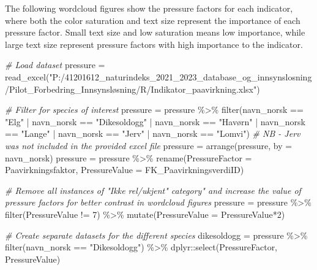 \documentclass[
]{book}
\newenvironment{Shaded}{\begin{snugshade}}{\end{snugshade}}
\newcommand{\AttributeTok}[1]{\textcolor[rgb]{0.77,0.63,0.00}{#1}}
\newcommand{\CommentTok}[1]{\textcolor[rgb]{0.56,0.35,0.01}{\textit{#1}}}
\newcommand{\DecValTok}[1]{\textcolor[rgb]{0.00,0.00,0.81}{#1}}
\newcommand{\FunctionTok}[1]{\textcolor[rgb]{0.00,0.00,0.00}{#1}}
\newcommand{\NormalTok}[1]{#1}
\newcommand{\OtherTok}[1]{\textcolor[rgb]{0.56,0.35,0.01}{#1}}
\newcommand{\SpecialCharTok}[1]{\textcolor[rgb]{0.00,0.00,0.00}{#1}}
\newcommand{\StringTok}[1]{\textcolor[rgb]{0.31,0.60,0.02}{#1}}
\begin{document}
The following wordcloud figures show the pressure factors for each indicator, where both the color saturation and text size represent the importance of each pressure factor. Small text size and low saturation means low importance, while large text size represent pressure factors with high importance to the indicator.

\begin{Shaded}
\begin{Highlighting}[]

\CommentTok{\# Load dataset}
\NormalTok{pressure }\OtherTok{=} \FunctionTok{read\_excel}\NormalTok{(}\StringTok{"P:/41201612\_naturindeks\_2021\_2023\_database\_og\_innsynslosning/Pilot\_Forbedring\_Innsynsløsning/R/Indikator\_paavirkning.xlsx"}\NormalTok{)}

\CommentTok{\# Filter for species of interest}
\NormalTok{pressure }\OtherTok{=}\NormalTok{ pressure }\SpecialCharTok{\%\textgreater{}\%} \FunctionTok{filter}\NormalTok{(navn\_norsk }\SpecialCharTok{==} \StringTok{"Elg"} \SpecialCharTok{|}\NormalTok{ navn\_norsk }\SpecialCharTok{==} \StringTok{"Dikesoldogg"} \SpecialCharTok{|}\NormalTok{ navn\_norsk }\SpecialCharTok{==} \StringTok{"Havørn"} \SpecialCharTok{|}\NormalTok{ navn\_norsk }\SpecialCharTok{==} \StringTok{"Lange"} \SpecialCharTok{|}\NormalTok{ navn\_norsk }\SpecialCharTok{==} \StringTok{"Jerv"} \SpecialCharTok{|}\NormalTok{ navn\_norsk }\SpecialCharTok{==} \StringTok{"Lomvi"}\NormalTok{) }\CommentTok{\# NB {-} Jerv was not included in the provided excel file}
\NormalTok{pressure }\OtherTok{=} \FunctionTok{arrange}\NormalTok{(pressure, }\AttributeTok{by =}\NormalTok{ navn\_norsk)}
\NormalTok{pressure }\OtherTok{=}\NormalTok{ pressure }\SpecialCharTok{\%\textgreater{}\%} \FunctionTok{rename}\NormalTok{(}\AttributeTok{PressureFactor =}\NormalTok{ Paavirkningsfaktor, }\AttributeTok{PressureValue =}\NormalTok{ FK\_PaavirkningsverdiID)}

\CommentTok{\# Remove all instances of "Ikke rel/ukjent" category" and increase the value of pressure factors for better contrast in wordcloud figures}
\NormalTok{pressure }\OtherTok{=}\NormalTok{ pressure }\SpecialCharTok{\%\textgreater{}\%} \FunctionTok{filter}\NormalTok{(PressureValue }\SpecialCharTok{!=} \DecValTok{7}\NormalTok{) }\SpecialCharTok{\%\textgreater{}\%} \FunctionTok{mutate}\NormalTok{(}\AttributeTok{PressureValue =}\NormalTok{ PressureValue}\SpecialCharTok{*}\DecValTok{2}\NormalTok{) }

\CommentTok{\# Create separate datasets for the different species}
\NormalTok{dikesoldogg }\OtherTok{=}\NormalTok{ pressure }\SpecialCharTok{\%\textgreater{}\%} \FunctionTok{filter}\NormalTok{(navn\_norsk }\SpecialCharTok{==} \StringTok{"Dikesoldogg"}\NormalTok{) }\SpecialCharTok{\%\textgreater{}\%}\NormalTok{ dplyr}\SpecialCharTok{::}\FunctionTok{select}\NormalTok{(PressureFactor, PressureValue)}


\end{Highlighting}
\end{Shaded}
\end{document}
